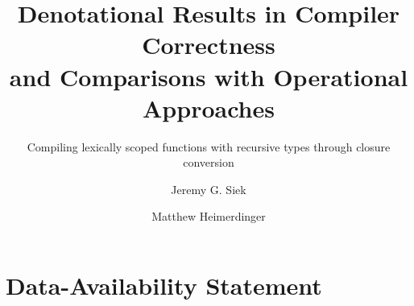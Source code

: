 \documentclass[acmsmall,screen,review,anonymous,nonacm]{acmart}
\begin{document}
\title[Denotational Results in Compiler Correctness and Comparisons with Operational Approaches]{Denotational Results in Compiler Correctness \\ and Comparisons with Operational Approaches}
\subtitle{Compiling lexically scoped functions with recursive types through closure conversion}

\author{Jeremy G. Siek}

\author{Matthew Heimerdinger}

\renewcommand{\shortauthors}{Siek and Heimerdinger}

\begin{abstract}
  
\end{abstract}


\maketitle

















\section*{Data-Availability Statement}
\end{document}
